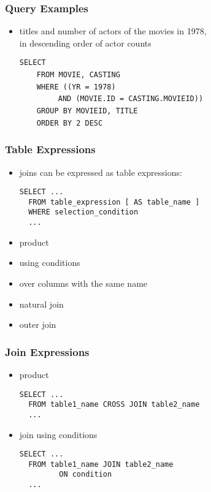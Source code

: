\documentclass[dvipsnames]{beamer}
\theoremstyle{plain}
\begin{document}
\begin{frame}[fragile]
  \frametitle{Query Examples}

  \begin{itemize}
    \item titles and number of actors of the movies in 1978,\\
      in descending order of actor counts

    \medskip
\lstinline!SELECT! \\
~~~~\lstinline!FROM MOVIE, CASTING!\\
\pause
~~~~\lstinline!WHERE ((YR = 1978)!\\
~~~~~~~~~\lstinline!AND (MOVIE.ID = CASTING.MOVIEID))!\\
\pause
~~~~\lstinline!GROUP BY MOVIEID, TITLE!\\
\pause\pause
~~~~\lstinline!ORDER BY 2 DESC!
  \end{itemize}
\end{frame}

\begin{frame}[fragile]
  \frametitle{Table Expressions}

  \begin{itemize}
    \item joins can be expressed as table expressions:
    \begin{lstlisting}
SELECT ...
  FROM table_expression [ AS table_name ]
  WHERE selection_condition
  ...
    \end{lstlisting}

    \medskip
    \item product
    \item using conditions
    \item over columns with the same name
    \item natural join
    \item outer join
  \end{itemize}
\end{frame}

\begin{frame}[fragile]
  \frametitle{Join Expressions}

  \begin{itemize}
    \item product
    \begin{lstlisting}
SELECT ...
  FROM table1_name CROSS JOIN table2_name
  ...
    \end{lstlisting}

    \pause
    \medskip
    \item join using conditions
    \begin{lstlisting}
SELECT ...
  FROM table1_name JOIN table2_name
         ON condition
  ...
    \end{lstlisting}
  \end{itemize}
\end{frame}
\end{document}
